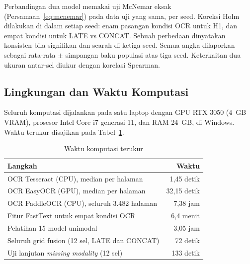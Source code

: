 Perbandingan dua model memakai uji McNemar eksak (Persamaan~\ref{eq:mcnemar}) pada data
uji yang sama, per seed. Koreksi Holm dilakukan di dalam setiap seed: enam pasangan
kondisi OCR untuk H1, dan empat kondisi untuk LATE vs CONCAT. Sebuah perbedaan dinyatakan
konsisten bila signifikan dan searah di ketiga seed. Semua angka dilaporkan sebagai
rata-rata $\pm$ simpangan baku populasi atas tiga seed. Keterkaitan dua ukuran antar-sel
diukur dengan korelasi Spearman.

\subsection{Lingkungan dan Waktu Komputasi}\label{sec:komputasi}

Seluruh komputasi dijalankan pada satu laptop dengan GPU RTX 3050 (4~GB VRAM), prosesor
Intel Core i7 generasi 11, dan RAM 24~GB, di Windows. Waktu terukur disajikan pada
Tabel~\ref{tab:waktu}.

\begin{table}[H]
  \centering
  \caption{Waktu komputasi terukur}
  \label{tab:waktu}
  \fontsize{10}{12}\selectfont
  \begin{tabularx}{\textwidth}{|>{\raggedright\arraybackslash}X|r|}
    \hline
    \textbf{Langkah} & \textbf{Waktu} \\ \hline
    OCR Tesseract (CPU), median per halaman & 1,45 detik \\ \hline
    OCR EasyOCR (GPU), median per halaman & 32,15 detik \\ \hline
    OCR PaddleOCR (CPU), seluruh 3.482 halaman & 7,38 jam \\ \hline
    Fitur FastText untuk empat kondisi OCR & 6,4 menit \\ \hline
    Pelatihan 15 model unimodal & 3,05 jam \\ \hline
    Seluruh grid fusion (12 sel, LATE dan CONCAT) & 72 detik \\ \hline
    Uji lanjutan \textit{missing modality} (12 sel) & 133 detik \\ \hline
  \end{tabularx}
\end{table}
